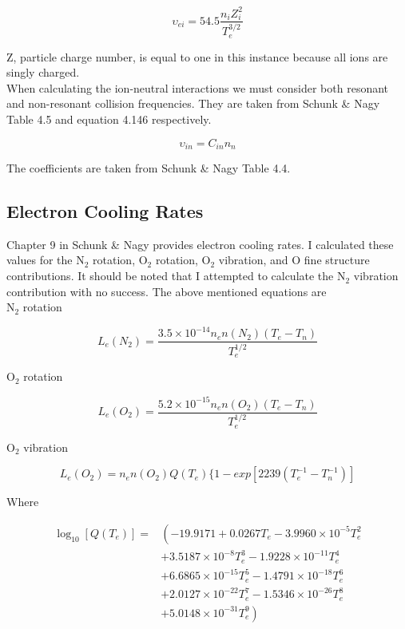 \documentclass[10pt]{article}
\begin{document}
\begin{equation}
\upsilon _{ei}= 54.5\frac{n_{i}Z_{i}^{2}}{T_{e}^{3/2}}
\end{equation}

\noindent Z, particle charge number, is equal to one in this instance because all ions are singly charged.
\\

\noindent When calculating the ion-neutral interactions we must consider both resonant and non-resonant collision frequencies.  They are taken from Schunk \& Nagy Table 4.5 and equation 4.146 respectively.

\begin{equation}
\upsilon _{in}= C_{in}n_{n}
\end{equation}

\noindent The coefficients are taken from Schunk \& Nagy Table 4.4.

\subsection{Electron Cooling Rates}
Chapter 9 in Schunk \& Nagy provides electron cooling rates. I calculated these values for the N$_{2}$ rotation, O$_{2}$ rotation, O$_{2}$ vibration, and O fine structure contributions. It should be noted that I attempted to calculate the N$_{2}$ vibration contribution with no success. The above mentioned equations are
\\

\noindent N$_{2}$ rotation

\begin{equation}
L_{e}(N_{2})=\frac{3.5 \times 10^{-14}n_{e}n(N_{2})(T_{e}-T_{n})}{T_{e}^{1/2}}
\end{equation}

\noindent O$_{2}$ rotation

\begin {equation}
L_{e}(O_{2})=\frac{5.2 \times 10^{-15}n_{e}n(O_{2})(T_{e}-T_{n})}{T_{e}^{1/2}}
\end {equation}

\noindent O$_{2}$ vibration

\begin{equation}
L_{e}(O_{2})=n_{e}n(O_{2})Q(T_{e})\{1-exp{[2239(T_{e}^{-1}-T_{n}^{-1})]}
\end{equation}

\noindent Where

\begin{equation}
\begin{split}
\log _{10} [Q(T_{e})] =& \left( -19.9171 + 0.0267T_{e} - 3.9960 \times 10^{-5}T_{e}^{2} \right. \\ & \left.
+ 3.5187 \times 10^{-8}T_{e}^{3} - 1.9228 \times 10^{-11}T_{e}^{4} \right. \\ & \left.
+ 6.6865 \times 10^{-15}T_{e}^{5} - 1.4791 \times 10^{-18}T_{e}^{6} \right. \\ & \left.
+ 2.0127 \times 10^{-22}T_{e}^{7} - 1.5346 \times 10^{-26}T_{e}^{8} \right. \\ & \left.
+ 5.0148 \times 10^{-31}T_{e}^{9} \right)
\end{split}
\end{equation}
\end{document}
